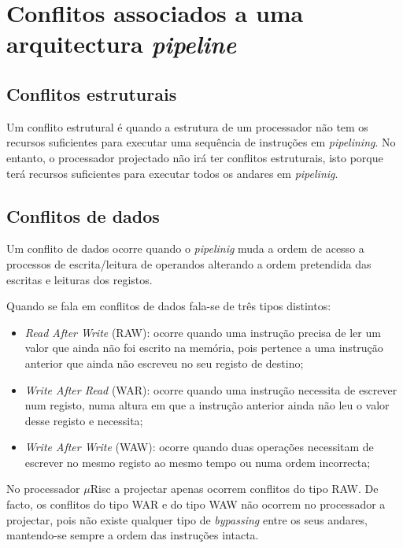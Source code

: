 \documentclass[11pt]{article}
\numberwithin{equation}{section}
\begin{document}
\section{Conflitos associados a uma arquitectura \textit{pipeline}}

\subsection{Conflitos estruturais}

Um conflito estrutural é quando a estrutura de um processador não tem os recursos suficientes para executar uma sequência de instruções em \textit{pipelining}. No entanto, o processador projectado não irá ter conflitos estruturais, isto porque terá recursos suficientes para executar todos os andares em \textit{pipelinig}.

\subsection{Conflitos de dados}

Um conflito de dados ocorre quando o \textit{pipelinig} muda a ordem de acesso a processos de escrita/leitura de operandos alterando a ordem pretendida das escritas e leituras dos registos.

Quando se fala em conflitos de dados fala-se de três tipos distintos:

\vspace{-1.5mm}

\begin{itemize}
	\item \textit{Read After Write} (RAW): ocorre quando uma instrução precisa de ler um valor que ainda não foi escrito na memória, pois pertence a uma instrução anterior que ainda não escreveu no seu registo de destino;
	\vspace{-2.5mm}
	\item \textit{Write After Read} (WAR): ocorre quando uma instrução necessita de escrever num registo, numa altura em que a instrução anterior ainda não leu o valor desse registo e necessita;
	\vspace{-2.5mm}
	\item \textit{Write After Write} (WAW): ocorre quando duas operações necessitam de escrever no mesmo registo ao mesmo tempo ou numa ordem incorrecta;
\end{itemize}

\vspace{-1.5mm}

No processador $\mu$Risc a projectar apenas ocorrem conflitos do tipo RAW. De facto, os conflitos do tipo WAR e do tipo WAW não ocorrem no processador a projectar, pois não existe qualquer tipo de \textit{bypassing} entre os seus andares, mantendo-se sempre a ordem das instruções intacta.
\end{document}
